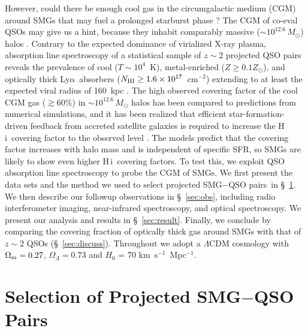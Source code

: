\documentclass[iop,revtex4,twocolumn,apj,numberedappendix,appendixfloats]{emulateapj}
\newcommand{\cmsq}{{cm$^{-2}$}}
\newcommand{\lya}{Ly$\alpha$}
\newcommand{\HI}{H\,{\sc i}}
\newcommand{\sqps}{SMG$-$QSO pairs}
\begin{document}
However, could there be enough cool gas in the circumgalactic medium (CGM) around SMGs that may fuel a prolonged starburst phase \citep[e.g.][]{Narayanan15}? The CGM of co-eval QSOs may give us a hint, because they inhabit comparably massive ($\sim$$10^{12.6}\,M_{\odot}$) halos \citep{White12}. Contrary to the expected dominance of virialized X-ray plasma, absorption line spectroscopy of a statistical sample of $z \sim 2$ projected QSO pairs reveals the prevalence of cool ($T \sim 10^4$~K), metal-enriched ($Z \geq 0.1 Z_\odot$), and optically thick \lya\ absorbers ($N_{\rm HI} \geq 1.6\times10^{17}$~\cmsq) extending to at least the expected viral radius of 160~kpc \citep[the ``Quasar Probing Quasar'' (QPQ) project:][]{Hennawi06,Prochaska13,Prochaska13a}. The high observed covering factor of the cool CGM gas ($\gtrsim 60\%$) in $\sim$$10^{12.6}\,M_{\odot}$ halos has been compared to predictions from numerical simulations, and it has been realized that efficient star-formation-driven feedback from accreted satellite galaxies is required to increase the \HI\ covering factor to the observed level \citep[e.g.,][]{Fumagalli14,Faucher-Giguere15,Rahmati15,Faucher-Giguere16}. The models predict that the covering factor increases with halo mass and is independent of specific SFR, so SMGs are likely to show even higher \HI\ covering factors. To test this, we exploit QSO absorption line spectroscopy to probe the CGM of SMGs. We first present the data sets and the method we used to select projected \sqps\ in \S~\ref{sec:sample}. We then describe our followup observations in \S~\ref{sec:obs}, including radio interferometer imaging, near-infrared spectroscopy, and optical spectroscopy. We present our analysis and results in \S~\ref{sec:result}. Finally, we conclude by comparing the covering fraction of optically thick gas around SMGs with that of $z \sim 2$ QSOs (\S~\ref{sec:discuss}). Throughout we adopt a $\Lambda$CDM cosmology with $\Omega_{\rm m}=0.27$, $\Omega_\Lambda=0.73$ and $H_0$ = 70 km~s$^{-1}$~Mpc$^{-1}$.  


\section{Selection of Projected SMG$-$QSO Pairs} \label{sec:sample}
\end{document}
